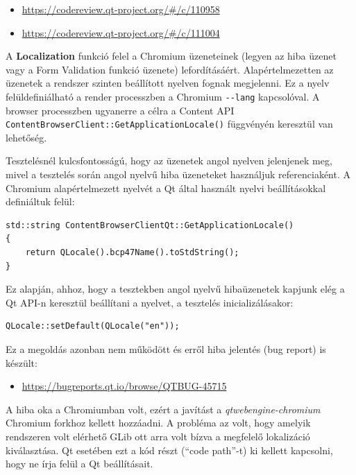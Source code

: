 \documentclass[12pt]{report}
\let\origurl\url
\renewcommand{\url}[1]{%
    \textcolor{blue}{\origurl{#1}}
}
\newcommand{\gerrit}[1]{%
    \textcolor{qtgreen}{\origurl{https://codereview.qt-project.org/\#/c/#1}}
}
\newcommand{\qtbug}[1]{%
    \textcolor{qtred}{\origurl{https://bugreports.qt.io/browse/QTBUG-#1}}
}
\begin{document}
\begin{center}
    \begin{reviewbox}
        \begin{itemize}
            \renewcommand{\labelitemi}{\textcolor{qtgreen}{$\blacktriangleright$}}
            \item \gerrit{110958}
            \item \gerrit{111004}
        \end{itemize}
    \end{reviewbox}
\end{center}

\noindent
A \textbf{Localization} funkció felel a Chromium üzeneteinek (legyen az hiba üzenet vagy
a Form Validation funkció üzenete) lefordításáért. Alapértelmezetten az üzenetek a
rendszer szinten beállított nyelven fognak megjelenni. Ez a nyelv felüldefiniálható
a render processzben a Chromium \texttt{-{}-lang} kapcsolóval. A browser processzben
ugyanerre a célra a Content API \texttt{ContentBrowserClient::GetApplicationLocale()}
függvényén keresztül van lehetőség.

Tesztelésnél kulcsfontosságú, hogy az üzenetek angol nyelven jelenjenek meg, mivel a
tesztelés során angol nyelvű hiba üzeneteket használjuk referenciaként. A Chromium
alapértelmezett nyelvét a Qt által használt nyelvi beállításokkal definiáltuk felül:
\begin{verbatim}
std::string ContentBrowserClientQt::GetApplicationLocale()
{
    return QLocale().bcp47Name().toStdString();
}
\end{verbatim}
Ez alapján, ahhoz, hogy a tesztekben angol nyelvű hibaüzenetek kapjunk elég a Qt API-n
keresztül beállítani a nyelvet, a tesztelés inicializálásakor:
\begin{verbatim}
QLocale::setDefault(QLocale("en"));
\end{verbatim}
Ez a megoldás azonban nem működött és erről hiba jelentés (bug report) is készült:
\begin{center}
    \begin{issuebox}
        \begin{itemize}
            \renewcommand{\labelitemi}{\textcolor{qtred}{$\blacktriangleright$}}
            \item \qtbug{45715}
        \end{itemize}
    \end{issuebox}
\end{center}

A hiba oka a Chromiumban volt, ezért a javítást a \textit{qtwebengine-chromium} Chromium
forkhoz kellett hozzáadni. A probléma az volt, hogy amelyik rendszeren volt elérhető
GLib ott arra volt bízva a megfelelő lokalizáció kiválasztása. Qt esetében ezt a kód részt
(``code path''-t) ki kellett kapcsolni, hogy ne írja felül a Qt beállításait.
\end{document}
